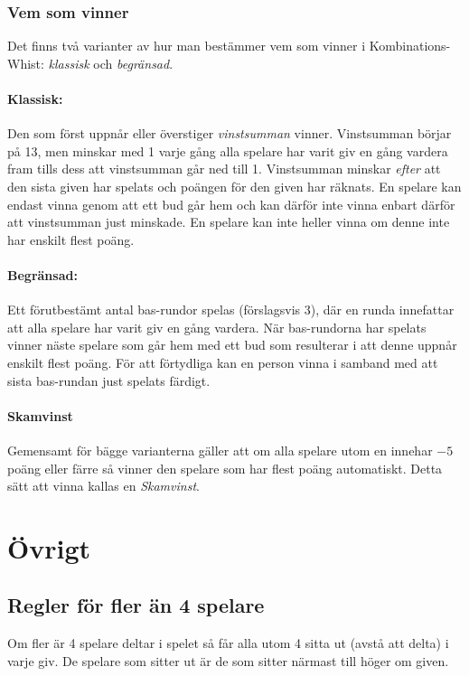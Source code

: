 \documentclass[a4paper]{article}
\begin{document}
			\subsubsection{Vem som vinner}
				\label{sec:winning}
				Det finns två varianter av hur man bestämmer vem som vinner i Kombinations-Whist: \emph{klassisk} och \emph{begränsad}.

				\paragraph{Klassisk:}
					Den som först uppnår eller överstiger \emph{vinstsumman} vinner. Vinstsumman börjar på 13, men minskar med 1 varje gång alla spelare har varit giv en gång vardera fram tills dess att vinstsumman går ned till 1. Vinstsumman minskar \emph{efter} att den sista given har spelats och poängen för den given har räknats. En spelare kan endast vinna genom att ett bud går hem och kan därför inte vinna enbart därför att vinstsumman just minskade. En spelare kan inte heller vinna om denne inte har enskilt flest poäng.

				\paragraph{Begränsad:}
					Ett förutbestämt antal bas-rundor spelas (förslagsvis 3), där en runda innefattar att alla spelare har varit giv en gång vardera. När bas-rundorna har spelats vinner näste spelare som går hem med ett bud som resulterar i att denne uppnår enskilt flest poäng. För att förtydliga kan en person vinna i samband med att sista bas-rundan just spelats färdigt.

				\paragraph{Skamvinst} Gemensamt för bägge varianterna gäller att om alla spelare utom en innehar $-5$ poäng eller färre så vinner den spelare som har flest poäng automatiskt. Detta sätt att vinna kallas en \emph{Skamvinst}.

	\section{Övrigt}
		\subsection{Regler för fler än 4 spelare}
			Om fler är 4 spelare deltar i spelet så får alla utom 4 sitta ut (avstå att delta) i varje giv. De spelare som sitter ut är de som sitter närmast till höger om given.
		
\end{document}
